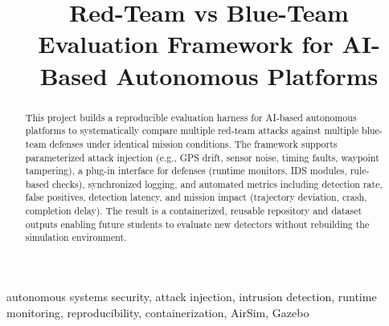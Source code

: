 \documentclass[conference]{IEEEtran}
\begin{document}
\title{Red-Team vs Blue-Team Evaluation Framework for AI-Based Autonomous Platforms\\
}

\author{

\and


}
\maketitle
\begin{abstract}
This project builds a reproducible evaluation harness for AI-based autonomous platforms to systematically compare multiple red-team attacks against multiple blue-team defenses under identical mission conditions. The framework supports parameterized attack injection (e.g., GPS drift, sensor noise, timing faults, waypoint tampering), a plug-in interface for defenses (runtime monitors, IDS modules, rule-based checks), synchronized logging, and automated metrics including detection rate, false positives, detection latency, and mission impact (trajectory deviation, crash, completion delay). The result is a containerized, reusable repository and dataset outputs enabling future students to evaluate new detectors without rebuilding the simulation environment.
\end{abstract}

\begin{IEEEkeywords}
autonomous systems security, attack injection, intrusion detection, runtime monitoring, reproducibility, containerization, AirSim, Gazebo
\end{IEEEkeywords}

%

\end{document}
